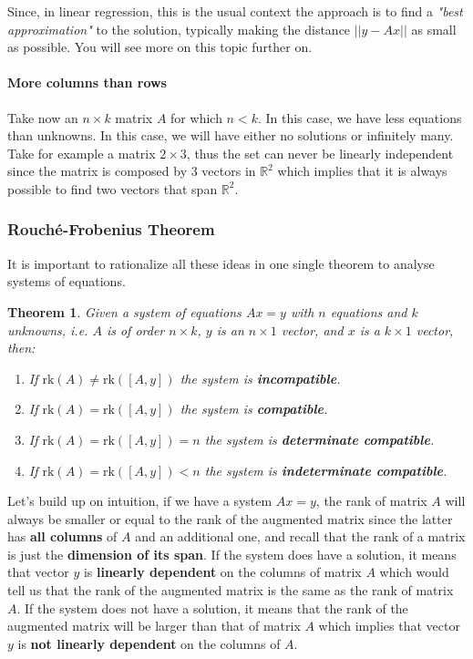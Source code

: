 \documentclass[a4paper,11pt]{article}
\theoremstyle{definition}
\theoremstyle{plain}
\newtheorem{theorem}{Theorem}
\begin{document}
Since, in linear regression, this is the usual context the approach is
to find a \emph{"best approximation"} to the solution, typically making
the distance \(||y - Ax||\) as small as possible. You will see more on
this topic further on.

\paragraph{More columns than rows}\label{more-columns-than-rows}

Take now an \(n\times k\) matrix \(A\) for which \(n < k\). In this
case, we have less equations than unknowns. In this case, we will have
either no solutions or infinitely many. Take for example a matrix
\(2\times 3\), thus the set can never be linearly independent since the
matrix is composed by 3 vectors in \(\mathbb{R}^2\) which implies that
it is always possible to find two vectors that span \(\mathbb{R}^2\).

\subsubsection{Rouché-Frobenius
Theorem}\label{rouchuxe9-frobenius-theorem}

It is important to rationalize all these ideas in one single theorem to
analyse systems of equations.

\begin{theorem}
Given a system of equations \(Ax = y\) with \(n\)
equations and \(k\) unknowns, i.e. \(A\) is of order \(n\times k\),
\(y\) is an \(n\times 1\) vector, and \(x\) is a \(k\times 1\) vector,
then:

\begin{enumerate}
\def\labelenumi{\arabic{enumi}.}
\item
  If \(\text{rk}(A) \neq \text{rk}\left([A,y]\right)\) the system is
  \textbf{incompatible}.
\item
  If \(\text{rk}(A) = \text{rk}\left([A,y]\right)\) the system is
  \textbf{compatible}.
\item
  If \(\text{rk}(A) = \text{rk}\left([A,y]\right) = n\) the system is
  \textbf{determinate compatible}.
\item
  If \(\text{rk}(A) = \text{rk}\left([A,y]\right) < n\) the system is
  \textbf{indeterminate compatible}.
\end{enumerate}
\end{theorem}

Let's build up on intuition, if we have a system \(Ax = y\), the rank of
matrix \(A\) will always be smaller or equal to the rank of the
augmented matrix since the latter has \textbf{all columns} of \(A\) and
an additional one, and recall that the rank of a matrix is just the
\textbf{dimension of its span}. If the system does have a solution, it
means that vector \(y\) is \textbf{linearly dependent} on the columns of
matrix \(A\) which would tell us that the rank of the augmented matrix
is the same as the rank of matrix \(A\). If the system does not have a
solution, it means that the rank of the augmented matrix will be larger
than that of matrix \(A\) which implies that vector \(y\) is \textbf{not
linearly dependent} on the columns of \(A\).
\end{document}
